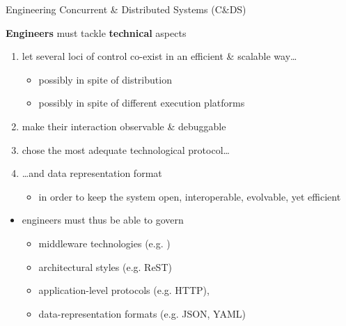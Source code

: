 \documentclass[presentation]{beamer}\mode<presentation>{\usetheme{AMSBolognaFC}}
\begin{document}
\begin{frame}[c,allowframebreaks]{Engineering Concurrent \& Distributed Systems (C\&DS)}
    \framebreak

    \begin{block}{\textbf{Engineers} must tackle \textbf{technical} aspects}
        \begin{enumerate}
            \item let several loci of control \alert{co-exist} in an efficient \& scalable way\ldots
            \begin{itemize}
                \item possibly in spite of \alert{distribution}
                \item possibly in spite of different \alert{execution platforms}
            \end{itemize}
            \item make their interaction \alert{observable \& debuggable}
            \item chose the most adequate \alert{technological protocol}\ldots
            \item \ldots and data \alert{representation format}
            \begin{itemize}
                \item in order to keep the system open, interoperable, evolvable, yet efficient
            \end{itemize}
        \end{enumerate}
    \end{block}

    \medskip

    \begin{itemize}
        \item engineers must thus be able to govern
        \begin{itemize}
            \item middleware technologies (e.g. \jade{})
            \item architectural styles (e.g. ReST)
            \item application-level protocols (e.g. HTTP),
            \item data-representation formats (e.g. JSON, YAML)
        \end{itemize}
    \end{itemize}

    \framebreak


\end{frame}
\end{document}
